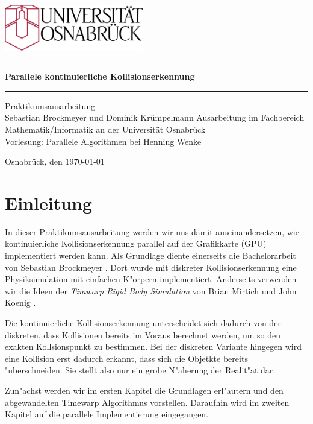 \documentclass[a4paper, 10pt, openright, parskip, chapterprefix]{scrreprt}
\begin{document}
\begin{titlepage}
\thispagestyle{empty}
\vspace{10mm}
\begin{center}
\includegraphics[height=20mm]{unilogo.eps}
\vfill
\rule{\textwidth}{0.1mm}\vspace{5mm}
\Huge\textbf{Parallele kontinuierliche Kollisionserkennung}
\vspace{1mm}\rule{\textwidth}{0.1mm}
\vfill
\Large
Praktikumsausarbeitung\\
Sebastian Brockmeyer und Dominik Krümpelmann
\vfill
\normalsize
Ausarbeitung  im Fachbereich Mathematik/Informatik an der Universität Osnabrück \\
Vorlesung: Parallele Algorithmen bei Henning Wenke

Osnabrück, den \today
\end{center}
\end{titlepage}

\newpage
\mbox{}
\thispagestyle{empty}
\chapter*{Einleitung}
\setcounter{page}{1}
In dieser Praktikumsausarbeitung werden wir uns damit auseinandersetzen, wie kontinuierliche Kollisionserkennung parallel auf der Grafikkarte (GPU)
implementiert werden kann. Als Grundlage diente einerseits die Bachelorarbeit von Sebastian Brockmeyer \cite{bachelor}. Dort wurde mit diskreter 
Kollisionserkennung eine Physiksimulation mit einfachen K"orpern implementiert. Anderseits verwenden wir die Ideen der \emph{Timwarp Rigid Body Simulation} von Brian Mirtich \cite{timewarp}
und John Koenig \cite{timewarp-cpu}.

Die kontinuierliche Kollisionserkennung unterscheidet sich dadurch von der diskreten, dass Kollisionen bereits im
Voraus berechnet werden, um so den exakten Kollsionspunkt zu bestimmen. Bei der diskreten Variante hingegen wird eine Kollision erst dadurch erkannt,
dass sich die Objetkte bereits "uberschneiden. Sie stellt also nur ein grobe N"aherung der Realit"at dar.

Zun"achst werden wir im ersten Kapitel die Grundlagen erl"autern und den abgewandelten Timewarp Algorithmus vorstellen.
Daraufhin wird im zweiten Kapitel auf die parallele Implementierung eingegangen.
\end{document}

